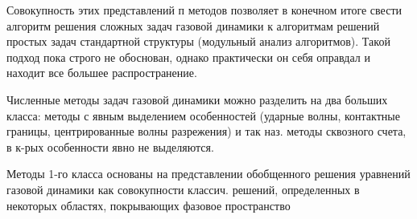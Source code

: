 \documentclass[10pt]{article}
\begin{document}
Совокупность этих представлений п методов позволяет в конечном итоге свести алгоритм решения сложных задач газовой динамики к алгоритмам решений простых задач стандартной структуры (модульный анализ алгоритмов). Такой подход пока строго не обоснован, однако практически он себя оправдал и находит все большее распространение.



Численные методы задач газовой динамики можно разделить на два больших класса: методы с явным выделением особенностей (ударные волны, контактные границы, центрированные волны разрежения) и так наз. методы сквозного счета, в к-рых особенности явно не выделяются.



Методы 1-го класса основаны на представлении обобщенного решения уравнений газовой динамики как совокупности классич. решений, определенных в некоторых областях, покрывающих фазовое пространство
\end{document}
